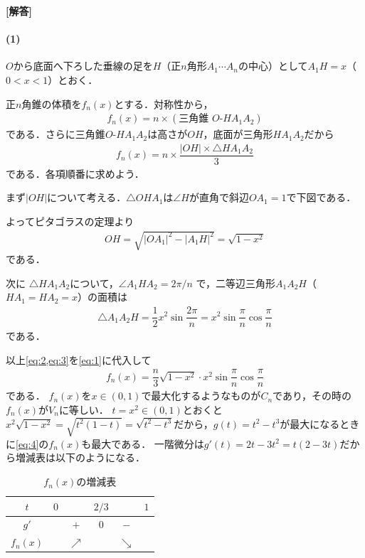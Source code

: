 \documentclass[../../main.tex]{subfiles}
\begin{document}
\begin{oframed}
  
\end{oframed}

{\bf [解答]}

\paragraph{(1)}
$O$から底面へ下ろした垂線の足を$H$（正$n$角形$A_1\cdots A_n$の中心）として$A_1H=x$（$0<x<1$）とおく．

正$n$角錐の体積を$f_n(x)$とする．対称性から，
\begin{align}
  f_n(x)=n\times(\text{三角錐 } O\text{-}HA_1A_2)
\end{align}
である．さらに三角錐$O\text{-}HA_1A_2$は高さが$OH$，底面が三角形$HA_1A_2$だから
\begin{align}
  f_n(x)=n\times \dfrac{|OH|\times \triangle HA_1A_2}{3} \label{eq:1}
\end{align}
である．各項順番に求めよう．

まず$|OH|$について考える．$\triangle OHA_1$は$\angle H$が直角で斜辺$OA_1=1$で下図である．

よってピタゴラスの定理より
\begin{align}
  OH=\sqrt{|OA_1|^2-|A_1H|^2}=\sqrt{1-x^2} \label{eq:2}
\end{align}
である．

次に $\triangle HA_1A_2$について，$\angle A_1HA_2=2\pi/n$ で，二等辺三角形$A_1A_2H$（$HA_1=HA_2=x$）の面積は
\begin{align}
  \triangle A_1A_2H=\dfrac{1}{2}x^2\sin\dfrac{2\pi}{n}=x^2\sin\dfrac{\pi}{n}\cos\dfrac{\pi}{n} \label{eq:3}
\end{align}
である．

以上\cref{eq:2,eq:3}を\cref{eq:1}に代入して
\begin{align}
  f_n(x)=\dfrac{n}{3}\sqrt{1-x^2}\cdot x^2\sin\dfrac{\pi}{n}\cos\dfrac{\pi}{n} \label{eq:4}
\end{align}
である．
$f_n(x)$を$x\in(0,1)$で最大化するようなものが$C_n$であり，その時の$f_n(x)$が$V_n$に等しい．
$t=x^2\in(0,1)$とおくと$x^2\sqrt{1-x^2}=\sqrt{t^2(1-t)}=\sqrt{t^2-t^3}$だから，$g(t)=t^2-t^3$が最大になるときに\cref{eq:4}の$f_n(x)$も最大である．
一階微分は$g'(t)=2t-3t^2=t(2-3t)$だから増減表は以下のようになる．

\begin{table}[htb]
  \centering
  \caption{$f_n(x)$の増減表}
  \begin{tabular}{c|ccccc}
    $t$ & $0$ & & $2/3$ & & $1$ \\
    \hline
    $g'$ & & $+$ & $0$ & $-$ & \\
    \hline
    $f_n(x)$ & & $\nearrow$ & & $\searrow$ &
  \end{tabular}
\end{table}
\end{document}
